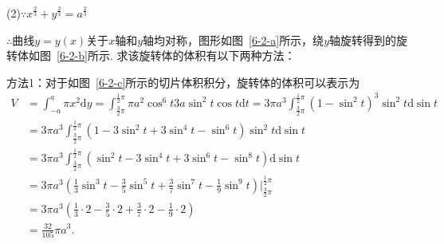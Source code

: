 \documentclass[12pt,UTF8]{ctexart}
\begin{document}
\begin{enumerate}
(2)$\because x^{\frac23}+y^{\frac23}=a^{\frac23}$

$\therefore$曲线$y=y(x)$关于$x$轴和$y$轴均对称，图形如图~\ref{6-2-a}所示，绕$y$轴旋转得到的旋转体如图~\ref{6-2-b}所示. 
求该旋转体的体积有以下两种方法：

方法1：对于如图~\ref{6-2-c}所示的切片体积积分，旋转体的体积可以表示为
\[\begin{split}
V&=\int_{-a}^a\pi x^2\mathrm dy=\int_{\frac32\pi}^{\frac12\pi}\pi a^2\cos^6t3a\sin^2t\cos t\mathrm dt=3\pi a^3\int_{\frac32\pi}^{\frac12\pi}(1-\sin^2t)^3\sin^2t\mathrm d\sin t\\
&=3\pi a^3\int_{\frac32\pi}^{\frac12\pi}(1-3\sin^2t+3\sin^4t-\sin^6t)\sin^2t\mathrm d\sin t\\
&=3\pi a^3\int_{\frac32\pi}^{\frac12\pi}(\sin^2t-3\sin^4t+3\sin^6t-\sin^8t)\mathrm d\sin t\\
&=3\pi a^3(\frac13\sin^3t-\frac35\sin^5t+\frac37\sin^7t-\frac19\sin^9t)\Big|_{\frac32\pi}^{\frac12\pi}\\
&=3\pi a^3(\frac13\cdot2-\frac35\cdot2+\frac37\cdot2-\frac19\cdot2)\\
&=\frac{32}{105}\pi a^3.
\end{split}\]


\end{enumerate}
\end{document}
